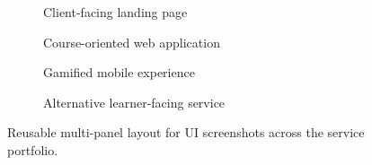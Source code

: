 \begin{figure}[p]
    \centering
    \begin{subfigure}[t]{0.48\linewidth}
        \centering
        \caption{Client-facing landing page}
    \end{subfigure}
    \hfill
    \begin{subfigure}[t]{0.48\linewidth}
        \centering
        \caption{Course-oriented web application}
    \end{subfigure}

    \vspace{1em}

    \begin{subfigure}[t]{0.48\linewidth}
        \centering
        \caption{Gamified mobile experience}
    \end{subfigure}
    \hfill
    \begin{subfigure}[t]{0.48\linewidth}
        \centering
        \caption{Alternative learner-facing service}
    \end{subfigure}

    \caption{Reusable multi-panel layout for UI screenshots across the service portfolio.}
    \label{fig:service-ui-grid}
\end{figure}
